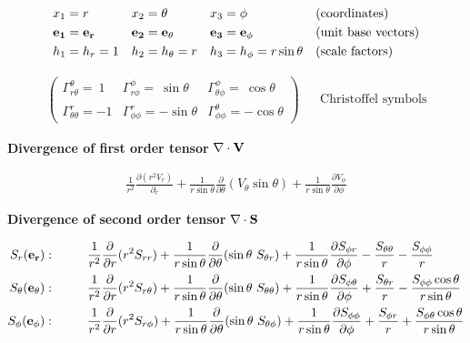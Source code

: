 \documentclass[10pt,paper=a4]{report}
\newcommand{\dr}{\frac{\partial}{\partial r}}
\begin{document}
\begin{align}
& x_1 = r & & x_2 = \theta & & x_3 = \phi & & \mbox{(coordinates)} \\
& {\bf{e_1 = e_r}} & &  {\bf{e_2 = e_\theta}} & & {\bf{e_3 = e_\phi}} && \mbox{(unit base vectors)} \\
& h_1 = h_r = 1 & &  h_2 = h_\theta = r & & h_3 = h_\phi = r \sin{\theta} & & \mbox{(scale factors)}
\end{align}

\begin{align}
\begin{pmatrix}
\Gamma_{r\theta}^\theta = \ 1  &  \Gamma_{r\phi}^\phi = \ \sin{\theta} & \Gamma_{\theta \phi}^{\phi} = \ \cos{\theta}   \\
\Gamma_{\theta \theta}^r = -1   &  \Gamma_{\phi \phi}^r = -\sin{\theta}  & \Gamma_{\phi \phi}^{\theta} = -\cos{\theta}  
\end{pmatrix} &&  \mbox{Christoffel symbols}
\end{align}

\newpage

\noindent
{{\bf{Divergence of first order tensor}} $\nabla \cdot {\bf{V}}$}

\begin{align}
\frac{1}{r^2} \frac{\partial (r^2 V_r) }{\partial_r} + \frac{1}{r \sin{\theta}}\frac{\partial}{\partial \theta}(V_\theta \sin{\theta}) + \frac{1}{r \sin{\theta}} \frac{\partial V_\phi}{\partial \phi}
\end{align}

\noindent
{{\bf{Divergence of second order tensor}} $\nabla \cdot {\bf{S}}$}

\begin{align}
S_r ({\bf{e_r}}): & \hspace{1cm} \frac{1}{r^2}\dr (r^2 S_{rr}) + \frac{1}{r\sin{\theta}}\frac{\partial}{\partial \theta} (\sin{\theta} \ S_{\theta r}) + \frac{1}{r\sin{\theta}}\frac{\partial S_{\phi r}}{\partial \phi} - \frac{S_{\theta\theta}}{r} - \frac{S_{\phi\phi}}{r} \\
S_\theta ({\bf{e_\theta}}): & \hspace{1cm} \frac{1}{r^2}\dr (r^2 S_{r \theta}) + \frac{1}{r\sin{\theta}}\frac{\partial}{\partial \theta} (\sin{\theta} \ S_{\theta\theta}) + \frac{1}{r\sin{\theta}}\frac{\partial S_{\phi \theta}}{\partial \phi} + \frac{S_{\theta r}}{r} - \frac{S_{\phi\phi} \cos{\theta}}{r\sin{\theta}} \\
S_\phi ({\bf{e_\phi}}): & \hspace{1cm} \frac{1}{r^2}\dr (r^2 S_{r \phi}) + \frac{1}{r\sin{\theta}}\frac{\partial}{\partial \theta} (\sin{\theta} \ S_{\theta \phi}) + \frac{1}{r\sin{\theta}}\frac{\partial S_{\phi\phi}}{\partial \phi} + \frac{S_{\phi r}}{r} + \frac{S_{\phi \theta} \cos{\theta}}{r\sin{\theta}}
\end{align}
\end{document}
